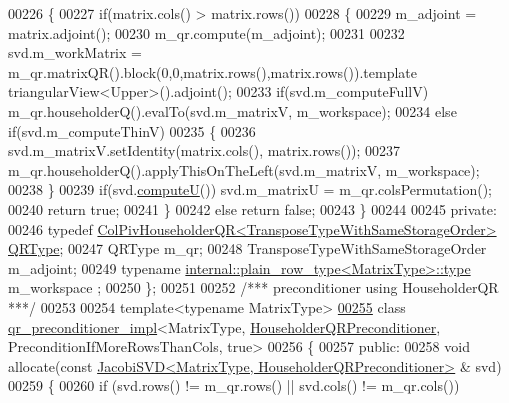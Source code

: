 \begin{DoxyCode}
00226   \{
00227     \textcolor{keywordflow}{if}(matrix.cols() > matrix.rows())
00228     \{
00229       m\_adjoint = matrix.adjoint();
00230       m\_qr.compute(m\_adjoint);
00231 
00232       svd.m\_workMatrix = m\_qr.matrixQR().block(0,0,matrix.rows(),matrix.rows()).\textcolor{keyword}{template} 
      triangularView<Upper>().adjoint();
00233       \textcolor{keywordflow}{if}(svd.m\_computeFullV) m\_qr.householderQ().evalTo(svd.m\_matrixV, m\_workspace);
00234       \textcolor{keywordflow}{else} \textcolor{keywordflow}{if}(svd.m\_computeThinV)
00235       \{
00236         svd.m\_matrixV.setIdentity(matrix.cols(), matrix.rows());
00237         m\_qr.householderQ().applyThisOnTheLeft(svd.m\_matrixV, m\_workspace);
00238       \}
00239       \textcolor{keywordflow}{if}(svd.\hyperlink{group___s_v_d___module_a705a7c2709e1624ccc19aa748a78d473}{computeU}()) svd.m\_matrixU = m\_qr.colsPermutation();
00240       \textcolor{keywordflow}{return} \textcolor{keyword}{true};
00241     \}
00242     \textcolor{keywordflow}{else} \textcolor{keywordflow}{return} \textcolor{keyword}{false};
00243   \}
00244 
00245 \textcolor{keyword}{private}:
00246   \textcolor{keyword}{typedef} \hyperlink{group___q_r___module}{ColPivHouseholderQR<TransposeTypeWithSameStorageOrder>}
       \hyperlink{group___q_r___module}{QRType};
00247   QRType m\_qr;
00248   TransposeTypeWithSameStorageOrder m\_adjoint;
00249   \textcolor{keyword}{typename} \hyperlink{class_eigen_1_1internal_1_1_tensor_lazy_evaluator_writable}{internal::plain\_row\_type<MatrixType>::type} m\_workspace
      ;
00250 \};
00251 
00252 \textcolor{comment}{/*** preconditioner using HouseholderQR ***/}
00253 
00254 \textcolor{keyword}{template}<\textcolor{keyword}{typename} MatrixType>
\hyperlink{class_eigen_1_1internal_1_1qr__preconditioner__impl_3_01_matrix_type_00_01_householder_q_r_preco3db9481bdea35fcb59961342158459cb}{00255} \textcolor{keyword}{class }\hyperlink{struct_eigen_1_1internal_1_1qr__preconditioner__impl}{qr\_preconditioner\_impl}<MatrixType, 
      \hyperlink{group__enums_gga46eba0d5c621f590b8cf1b53af31d56ea25d36655046e5910c850f62f84f34e25}{HouseholderQRPreconditioner}, PreconditionIfMoreRowsThanCols, true>
00256 \{
00257 \textcolor{keyword}{public}:
00258   \textcolor{keywordtype}{void} allocate(\textcolor{keyword}{const} \hyperlink{group___s_v_d___module_class_eigen_1_1_jacobi_s_v_d}{JacobiSVD<MatrixType, HouseholderQRPreconditioner>}
      & svd)
00259   \{
00260     \textcolor{keywordflow}{if} (svd.rows() != m\_qr.rows() || svd.cols() != m\_qr.cols())

\end{DoxyCode}
